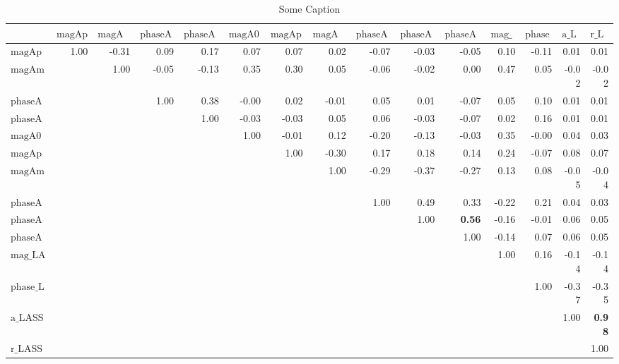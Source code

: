 \small
\renewcommand*{\arraystretch}{1.}
\renewcommand{\pm}{\ensuremath{\oldpm} }
\begin{sidewaystable}[h]
\begin{center}
\begin{tabular}{@{}|l|r|r|r|r|r|r|r|r|r|r|r|r|r|r|@{}}
\hline
 & $\text{magApKst892}$ & $\text{magAmKst892}$ & $\text{phaseApKst892}$ & $\text{phaseAmKst892}$ & $\text{magA0K21430}$ & $\text{magApK21430}$ & $\text{magAmK21430}$ & $\text{phaseA0K21430}$ & $\text{phaseApK21430}$ & $\text{phaseAmK21430}$ & $\text{mag\_LASS}$ & $\text{phase\_LASS}$ & $\text{a\_LASS}$ & $\text{r\_LASS}$\\ \hline \hline
$\text{magApKst892}$ & 1.00 & -0.31 & 0.09 & 0.17 & 0.07 & 0.07 & 0.02 & -0.07 & -0.03 & -0.05 & 0.10 & -0.11 & 0.01 & 0.01 \\
$\text{magAmKst892}$ &  & 1.00 & -0.05 & -0.13 & 0.35 & 0.30 & 0.05 & -0.06 & -0.02 & 0.00 & 0.47 & 0.05 & -0.02 & -0.02 \\
$\text{phaseApKst892}$ &  &  & 1.00 & 0.38 & -0.00 & 0.02 & -0.01 & 0.05 & 0.01 & -0.07 & 0.05 & 0.10 & 0.01 & 0.01 \\
$\text{phaseAmKst892}$ &  &  &  & 1.00 & -0.03 & -0.03 & 0.05 & 0.06 & -0.03 & -0.07 & 0.02 & 0.16 & 0.01 & 0.01 \\
$\text{magA0K21430}$ &  &  &  &  & 1.00 & -0.01 & 0.12 & -0.20 & -0.13 & -0.03 & 0.35 & -0.00 & 0.04 & 0.03 \\
$\text{magApK21430}$ &  &  &  &  &  & 1.00 & -0.30 & 0.17 & 0.18 & 0.14 & 0.24 & -0.07 & 0.08 & 0.07 \\
$\text{magAmK21430}$ &  &  &  &  &  &  & 1.00 & -0.29 & -0.37 & -0.27 & 0.13 & 0.08 & -0.05 & -0.04 \\
$\text{phaseA0K21430}$ &  &  &  &  &  &  &  & 1.00 & 0.49 & 0.33 & -0.22 & 0.21 & 0.04 & 0.03 \\
$\text{phaseApK21430}$ &  &  &  &  &  &  &  &  & 1.00 & \bf{0.56} & -0.16 & -0.01 & 0.06 & 0.05 \\
$\text{phaseAmK21430}$ &  &  &  &  &  &  &  &  &  & 1.00 & -0.14 & 0.07 & 0.06 & 0.05 \\
$\text{mag\_LASS}$ &  &  &  &  &  &  &  &  &  &  & 1.00 & 0.16 & -0.14 & -0.14 \\
$\text{phase\_LASS}$ &  &  &  &  &  &  &  &  &  &  &  & 1.00 & -0.37 & -0.35 \\
$\text{a\_LASS}$ &  &  &  &  &  &  &  &  &  &  &  &  & 1.00 & \bf{0.98} \\
$\text{r\_LASS}$ &  &  &  &  &  &  &  &  &  &  &  &  &  & 1.00 \\
\hline
\end{tabular}
\caption{Some Caption}
\label{thisTable}
\end{center}
\end{sidewaystable}
\renewcommand{\pm}{\oldpm}
\restoregeometry

